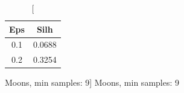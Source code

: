 \documentclass{classrep}
\begin{document}
{{{\begin{table}[!htbp]
\begin{minipage}{.24\textwidth}
                    \end{minipage}
                    \hfill
                    \begin{minipage}{.24\textwidth}
                        \centering
                        \begin{tabular}{|c|c|}
                            \hline
                            Eps & Silh \\ \hline
                            0.1 & 0.0688 \\ \hline
                            0.2 & 0.3254 \\ \hline
                        \end{tabular}
                        \caption
                        [Moons, min samples: 9]
                        {Moons, min samples: 9}
                        \label{db_scan_table_Moons_manh_min_sample9}
                    \end{minipage}
                \end{table}
                \FloatBarrier


            }

        }

    }
\end{document}
